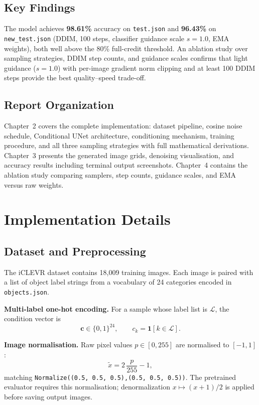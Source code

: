 \documentclass[12pt, a4paper]{report}
\begin{document}
\section*{Key Findings}

The model achieves \textbf{98.61\%} accuracy on \texttt{test.json} and
\textbf{96.43\%} on \texttt{new\_test.json} (DDIM, 100 steps, classifier guidance
scale $s=1.0$, EMA weights), both well above the 80\% full-credit threshold.
An ablation study over sampling strategies, DDIM step counts, and guidance scales
confirms that light guidance ($s=1.0$) with per-image gradient norm clipping and
at least 100 DDIM steps provide the best quality--speed trade-off.

\section*{Report Organization}

Chapter~2 covers the complete implementation: dataset pipeline, cosine noise
schedule, Conditional UNet architecture, conditioning mechanism, training procedure,
and all three sampling strategies with full mathematical derivations.
Chapter~3 presents the generated image grids, denoising visualisation, and accuracy
results including terminal output screenshots.
Chapter~4 contains the ablation study comparing samplers, step counts, guidance
scales, and EMA versus raw weights.

\chapter{Implementation Details}

\section{Dataset and Preprocessing}

The iCLEVR dataset contains 18{,}009 training images.
Each image is paired with a list of object label strings from a vocabulary of 24
categories encoded in \texttt{objects.json}.

\textbf{Multi-label one-hot encoding.}
For a sample whose label list is $\mathcal{L}$, the condition vector is
\[
  \mathbf{c} \in \{0,1\}^{24},\qquad c_k = \mathbf{1}[k \in \mathcal{L}].
\]

\textbf{Image normalisation.}
Raw pixel values $p \in [0,255]$ are normalised to $[-1,1]$:
\[
  \tilde{x} = 2\,\frac{p}{255} - 1,
\]
matching \texttt{Normalize((0.5, 0.5, 0.5),(0.5, 0.5, 0.5))}.
The pretrained evaluator requires this normalisation; denormalization $x \mapsto (x+1)/2$
is applied before saving output images.
\end{document}
